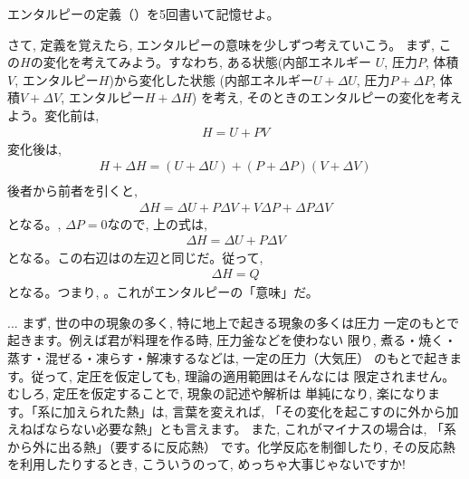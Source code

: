 \begin{q}\label{q:def_enthalpy} エンタルピーの定義（）を5回書いて記憶せよ。\end{q}\mv

さて, 定義を覚えたら, エンタルピーの意味を少しずつ考えていこう。
まず, この$H$の変化を考えてみよう。すなわち, ある状態(内部エネルギー
$U$, 圧力$P$, 体積$V$, エンタルピー$H$)から変化した状態
(内部エネルギー$U+\Delta U$, 圧力$P+\Delta P$, 体積$V+\Delta V$, エンタルピー$H+\Delta H$)
を考え, そのときのエンタルピーの変化を考えよう。変化前は, 
\begin{eqnarray}
H=U+PV
\end{eqnarray}
変化後は, 
\begin{eqnarray}
H+\Delta H=(U+\Delta U)+(P+\Delta P)(V+\Delta V)\nonumber\\
\end{eqnarray}
後者から前者を引くと, 
\begin{eqnarray}
\Delta H=\Delta U+P\Delta V+V\Delta P+\Delta P\Delta V\label{eq:enthalpy_change05}
\end{eqnarray}
となる。, $\Delta P=0$なので, 上の式は, 
\begin{eqnarray}
\Delta H=\Delta U+P\Delta V
\end{eqnarray}
となる。この右辺はの左辺と同じだ。従って, 
\begin{eqnarray}
\Delta H=Q
\end{eqnarray}
となる。つまり, 。これがエンタルピーの「意味」だ。

\begin{faq}{\small{}
 ... まず, 世の中の現象の多く, 特に地上で起きる現象の多くは圧力
一定のもとで起きます。例えば君が料理を作る時, 圧力釜などを使わない
限り, 煮る・焼く・蒸す・混ぜる・凍らす・解凍するなどは, 一定の圧力（大気圧）
のもとで起きます。従って, 定圧を仮定しても, 理論の適用範囲はそんなには
限定されません。むしろ, 定圧を仮定することで, 現象の記述や解析は
単純になり, 楽になります。「系に加えられた熱」は, 言葉を変えれば, 
「その変化を起こすのに外から加えねばならない必要な熱」とも言えます。
また, これがマイナスの場合は, 「系から外に出る熱」（要するに反応熱）
です。化学反応を制御したり, その反応熱を利用したりするとき, こういうのって, 
めっちゃ大事じゃないですか!}\end{faq}\mv

